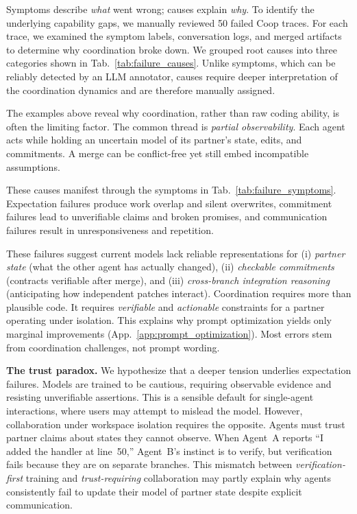 

Symptoms describe \emph{what} went wrong; causes explain \emph{why}. To identify the underlying capability gaps, we manually reviewed 50 failed Coop traces. For each trace, we examined the symptom labels, conversation logs, and merged artifacts to determine why coordination broke down. We grouped root causes into three categories shown in Tab.~\ref{tab:failure_causes}. Unlike symptoms, which can be reliably detected by an LLM annotator, causes require deeper interpretation of the coordination dynamics and are therefore manually assigned.




\medskip
The examples above reveal why coordination, rather than raw coding ability, is often the limiting factor. The common thread is \emph{partial observability}. Each agent acts while holding an uncertain model of its partner's state, edits, and commitments. A merge can be conflict-free yet still embed incompatible assumptions.

These causes manifest through the symptoms in Tab.~\ref{tab:failure_symptoms}. Expectation failures produce work overlap and silent overwrites, commitment failures lead to unverifiable claims and broken promises, and communication failures result in unresponsiveness and repetition.

These failures suggest current models lack reliable representations for (i) \emph{partner state} (what the other agent has actually changed), (ii) \emph{checkable commitments} (contracts verifiable after merge), and (iii) \emph{cross-branch integration reasoning} (anticipating how independent patches interact). Coordination requires more than plausible code. It requires \emph{verifiable} and \emph{actionable} constraints for a partner operating under isolation. This explains why prompt optimization yields only marginal improvements (App.~\ref{app:prompt_optimization}). Most errors stem from coordination challenges, not prompt wording.

\noindent\textbf{The trust paradox.} We hypothesize that a deeper tension underlies expectation failures. Models are trained to be cautious, requiring observable evidence and resisting unverifiable assertions. This is a sensible default for single-agent interactions, where users may attempt to mislead the model. However, collaboration under workspace isolation requires the opposite. Agents must trust partner claims about states they cannot observe. When Agent~A reports ``I added the handler at line~50,'' Agent~B's instinct is to verify, but verification fails because they are on separate branches. This mismatch between \emph{verification-first} training and \emph{trust-requiring} collaboration may partly explain why agents consistently fail to update their model of partner state despite explicit communication.


